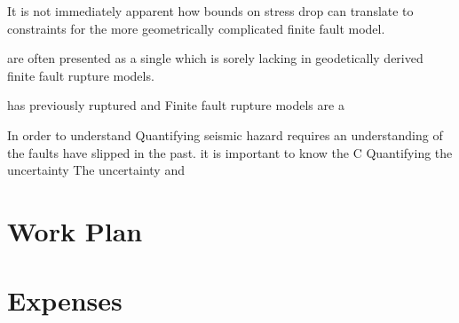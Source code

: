 \documentclass[12pt]{article}
\begin{document}
   It is not immediately apparent how bounds on stress drop can translate to constraints for the more geometrically complicated finite fault model.           
   

are often presented as a single which is sorely lacking in geodetically derived finite fault rupture models.

has previously ruptured and   
Finite fault rupture models are a 

In order to understand Quantifying seismic hazard requires an understanding of the faults have slipped in the past.  it is important to know the 
C
Quantifying the uncertainty The uncertainty 
\citep{Hines2016} and \citet{Hines2016}
\section*{Work Plan}

\section*{Expenses}

%

\end{document}
